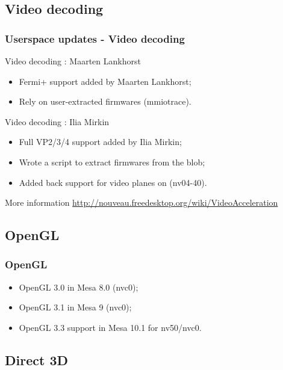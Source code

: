 \documentclass[11pt,english,compress]{beamer}
\begin{document}
\subsection{Video decoding}
\begin{frame}
	\frametitle{Userspace updates - Video decoding}

	\begin{block}{Video decoding : Maarten Lankhorst}
		\begin{itemize}
			\item Fermi+ support added by Maarten Lankhorst;
			\item Rely on user-extracted firmwares (mmiotrace).
		\end{itemize}
	\end{block}

	\begin{block}{Video decoding : Ilia Mirkin}
		\begin{itemize}
			\item Full VP2/3/4 support added by Ilia Mirkin;
			\item Wrote a script to extract firmwares from the blob;
			\item Added back support for video planes on (nv04-40).
		\end{itemize}
	\end{block}

	\begin{block}{More information}
		\url{http://nouveau.freedesktop.org/wiki/VideoAcceleration}
	\end{block}
\end{frame}

\subsection{OpenGL}

\begin{frame}
	\frametitle{OpenGL}

	\begin{block}{}
		\begin{itemize}
			\item OpenGL 3.0 in Mesa 8.0 (nvc0);
			\item OpenGL 3.1 in Mesa 9 (nvc0);
			\item OpenGL 3.3 support in Mesa 10.1 for nv50/nvc0.
		\end{itemize}
	\end{block}
\end{frame}

\subsection{Direct 3D}
\end{document}
